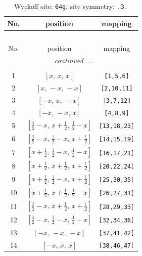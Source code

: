 \documentclass[fleqn,8pt]{jsarticle}
\begin{document}
\begin{longtable}{ccc}
\caption{Wyckoff site: {\tt 64g}, site symmetry: {\tt .3.}}
 \\
 \hline \hline
No. & position & mapping \\ \hline \endfirsthead

\multicolumn{2}{l}{\tablename\ \thetable{}} \\
 \hline \hline
No. & position & mapping \\ \hline \endhead

 \hline \hline
\multicolumn{2}{r}{\footnotesize\it continued ...} \\ \endfoot

 \hline \hline
\multicolumn{2}{r}{} \\ \endlastfoot

1 & $\left[ x,\, x,\, x \right]$ & {\tt [1,5,6]} \\ \hline
2 & $\left[ x,\, - x,\, - x \right]$ & {\tt [2,10,11]} \\ \hline
3 & $\left[ - x,\, x,\, - x \right]$ & {\tt [3,7,12]} \\ \hline
4 & $\left[ - x,\, - x,\, x \right]$ & {\tt [4,8,9]} \\ \hline
5 & $\left[ \frac{1}{2} - x,\, x + \frac{1}{2},\, \frac{1}{2} - x \right]$ & {\tt [13,18,23]} \\ \hline
6 & $\left[ \frac{1}{2} - x,\, \frac{1}{2} - x,\, x + \frac{1}{2} \right]$ & {\tt [14,15,19]} \\ \hline
7 & $\left[ x + \frac{1}{2},\, \frac{1}{2} - x,\, \frac{1}{2} - x \right]$ & {\tt [16,17,21]} \\ \hline
8 & $\left[ x + \frac{1}{2},\, x + \frac{1}{2},\, x + \frac{1}{2} \right]$ & {\tt [20,22,24]} \\ \hline
9 & $\left[ x + \frac{1}{2},\, \frac{1}{2} - x,\, x + \frac{1}{2} \right]$ & {\tt [25,30,35]} \\ \hline
10 & $\left[ x + \frac{1}{2},\, x + \frac{1}{2},\, \frac{1}{2} - x \right]$ & {\tt [26,27,31]} \\ \hline
11 & $\left[ \frac{1}{2} - x,\, x + \frac{1}{2},\, x + \frac{1}{2} \right]$ & {\tt [28,29,33]} \\ \hline
12 & $\left[ \frac{1}{2} - x,\, \frac{1}{2} - x,\, \frac{1}{2} - x \right]$ & {\tt [32,34,36]} \\ \hline
13 & $\left[ - x,\, - x,\, - x \right]$ & {\tt [37,41,42]} \\ \hline
14 & $\left[ - x,\, x,\, x \right]$ & {\tt [38,46,47]} \\ \hline

\end{longtable}
\end{document}
